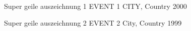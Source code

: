 



\begin{cvhonors}


  \cvhonor
    {Super geile auszeichnung 1} %
    {EVENT 1} %
    {CITY, Country} %
    {2000} %

  \cvhonor
    {Super geile auszeichnung 2} %
    {EVENT 2} %
    {City, Country} %
    {1999} %


\end{cvhonors}
